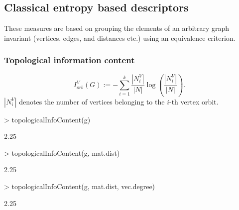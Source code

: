 \documentclass[a4paper]{article}
\begin{document}
\subsection{Classical entropy based descriptors}
\label{sec:clE}
These measures are based on grouping the elements of an arbitrary graph invariant (vertices, edges, and distances etc.) using an equivalence criterion.


\subsubsection*{Topological information content}
\begin{equation}\label{eq_mean_information_trucco}
I^V_{orb}(G) := -  \sum_{i=1}^{k} \frac{|N^V_i|}{|N|} \log \left( \frac{|N^V_i|}{|N|} \right).
\end{equation}
%
$|N^V_i|$ denotes the number of vertices belonging to the $i$-th vertex orbit.
\begin{Schunk}
\begin{Sinput}
> topologicalInfoContent(g)
\end{Sinput}
\begin{Soutput}
[1] 2.25
\end{Soutput}
\begin{Sinput}
> topologicalInfoContent(g, mat.dist)
\end{Sinput}
\begin{Soutput}
[1] 2.25
\end{Soutput}
\begin{Sinput}
> topologicalInfoContent(g, mat.dist, vec.degree)
\end{Sinput}
\begin{Soutput}
[1] 2.25
\end{Soutput}
\end{Schunk}
\end{document}
